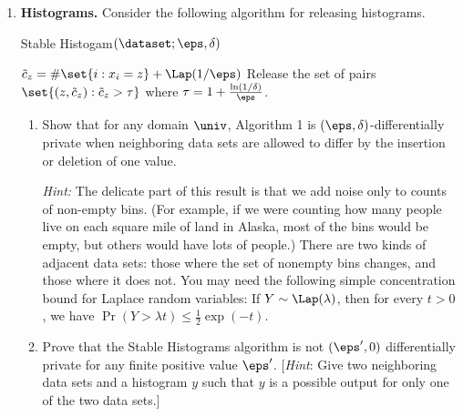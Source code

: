 \documentclass[11pt]{article}
\begin{document}
\begin{enumerate}[leftmargin=\parindent, itemsep=3ex]
\item         \textbf{Histograms.}
  Consider the following algorithm for releasing histograms.
  
  \begin{algorithm}[H]
  	\DontPrintSemicolon
    \caption{Stable Histogam$(\dataset; \eps,\delta)$}
    {
      $\tilde c_z = \#\set{i: x_i =z} + \Lap(1/\eps)$\;
    }
    Release the set of pairs $\set{(z, \tilde c_z) : \tilde c_z >
      \tau}$ where $\tau = 1+ \frac{\ln(1/\delta)}{\eps}$. 
  \end{algorithm}

  \begin{enumerate}
  \item Show that for any domain $\univ$, Algorithm 1 is
    $(\eps,\delta)$-differentially private when neighboring data sets
    are allowed to differ by the insertion or deletion of one value.

  
    \emph{Hint:} The delicate part of this result is that we add noise
    only to counts of non-empty bins. (For example, if we were
    counting how many people live on each square mile of land in
    Alaska, most of the bins would be empty, but others would have
    lots of people.) There are two kinds of adjacent data sets: those
    where the set of nonempty bins changes, and those where it does
    not.  You may need the following simple concentration bound for
    Laplace random variables: If $Y\sim\Lap(\lambda)$, then for every
    $t>0$, we have $\Pr( Y >\lambda t ) \leq \frac 1 2 \exp(-t)$.
  

    \item Prove that the Stable Histograms
    algorithm is not $(\eps',0)$ differentially private for any finite
    positive value $\eps'$. [\emph{Hint}: Give two neighboring data sets and
    a histogram $y$ such that $y$ is  a possible output for only one of
    the two data sets.]
  \end{enumerate}

\end{enumerate}
\end{document}
